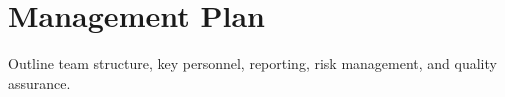 \chapter{Management Plan}
\label{chap:management}

Outline team structure, key personnel, reporting, risk management, and quality assurance.
